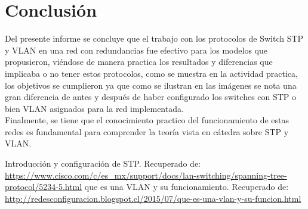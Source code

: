 \documentclass[spanish]{udpreport}
\begin{document}
\chapter{Conclusión}
Del presente informe se concluye que el trabajo con los protocolos de Switch STP y VLAN en una red con redundancias fue efectivo para los modelos que propusieron, viéndose de manera practica los resultados y diferencias que implicaba o no tener estos protocolos, como se muestra en la actividad practica, los objetivos se cumplieron ya que como se ilustran en las imágenes se nota una gran diferencia de antes y después de haber configurado los switches con STP o bien VLAN asignados para la red implementada.
\\ Finalmente, se tiene que el conocimiento practico del funcionamiento de estas redes es fundamental para comprender la teoría vista en cátedra sobre STP y VLAN.
\begin{thebibliography}{0}
Introducción y configuración de STP. Recuperado de: \\ \url{https://www.cisco.com/c/es_mx/support/docs/lan-switching/spanning-tree-protocol/5234-5.html}
que es una VLAN y su funcionamiento. Recuperado de: \\
\url{http://redesconfiguracion.blogspot.cl/2015/07/que-es-una-vlan-y-su-funcion.html}
\end{thebibliography}
\listoffigures
\end{document}

